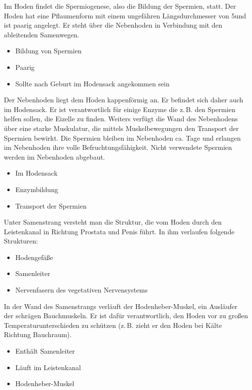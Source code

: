 {%
Im Hoden findet die Spermiogenese, also die Bildung der
Spermien, statt. Der Hoden hat eine Pflaumenform mit einem
ungefähren Längsdurchmesser von 5\CM* und ist paarig 
angelegt. Er steht über die Nebenhoden in Verbindung mit den
ableitenden Samenwegen.

}
{
\begin{itemize}
  \item Bildung von Spermien
  \item Paarig
  \item Sollte nach Geburt im Hodensack angekommen sein
\end{itemize}
}
{}{}{}


{%
Der Nebenhoden liegt dem Hoden kappenförmig an. Er befindet
sich daher auch im Hodensack. Er ist verantwortlich für
einige Enzyme die z.\,B. den Spermien helfen sollen, die
Eizelle zu finden. 
%
Weiters verfügt die Wand des Nebenhodens
über eine starke Muskulatur, 
die mittels Muskelbewegungen den Transport der Spermien bewirkt. 
%
Die Spermien
bleiben im Nebenhoden ca.  Tage und erlangen
im Nebenhoden ihre volle Befruchtungsfähigkeit.
%
Nicht verwendete Spermien werden im Nebenhoden abgebaut.
}{
\begin{itemize}
  \item Im Hodensack
  \item Enzymbildung
  \item Transport der Spermien
\end{itemize}

}{}{}{}


{
Unter Samenstrang versteht man die Struktur, die vom Hoden durch den
Leistenkanal in Richtung Prostata und Penis führt.
In ihm verlaufen folgende Strukturen:
\begin{itemize}
  \item Hodengefäße
  \item Samenleiter
  \item Nervenfasern des vegetativen Nervensystems
\end{itemize}

In der Wand des Samenstrangs verläuft der Hodenheber-Muskel,
ein Ausläufer der schrägen Bauchmuskeln. Er ist dafür
verantwortlich, den Hoden vor zu großen
Temperaturunterschieden zu schützen (z.\,B. zieht er den
Hoden bei Kälte Richtung Bauchraum).
}
{
\begin{itemize}
  \item Enthält Samenleiter
  \item Läuft im Leistenkanal
  \item Hodenheber-Muskel
\end{itemize}
}{}{}{}


